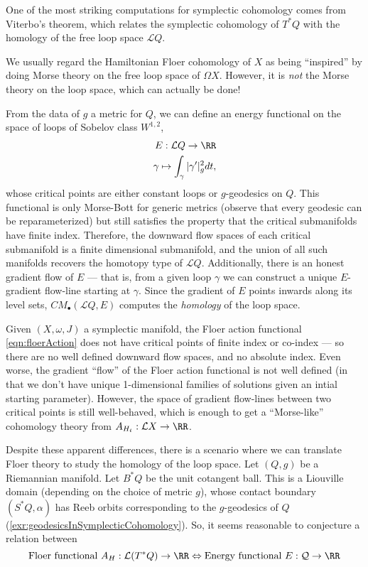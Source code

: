 
    One of the most striking computations for symplectic cohomology comes from Viterbo's theorem, which relates the symplectic cohomology of $T^*Q$ with the homology of the free loop space $\mathcal L Q$.
    
    We usually regard the Hamiltonian Floer cohomology of $X$ as being ``inspired'' by doing Morse theory on the free loop space of $\Omega X$. However, it is \emph{not} the Morse theory on the loop space, which can actually be done!

    From the data of $g$ a metric for $Q$, we can define an energy functional on the space of loops of Sobelov class $W^{1,2}$,
    \begin{align*}
        E: \mathcal LQ\to \RR\\
        \gamma\mapsto \int_{\gamma}|\gamma'|^2_gdt,
    \end{align*}
    whose critical points are either constant loops or $g$-geodesics on $Q$. 
    This functional is only Morse-Bott for generic metrics (observe that every geodesic can be reparameterized) but still satisfies the property that the critical submanifolds have finite index. Therefore, the downward flow spaces of each critical submanifold is a finite dimensional submanifold, and the union of all such manifolds recovers the homotopy type of $\mathcal LQ$. Additionally, there is an honest gradient flow of $E$ --- that is, from a given loop $\gamma$ we can construct a unique $E$-gradient flow-line starting at $\gamma$. Since the gradient of $E$ points inwards along its level sets,  $CM_\bullet(\mathcal LQ, E)$ computes the \emph{homology} of the loop space.

    Given $(X, \omega, J)$ a symplectic manifold, the Floer action functional \cref{eqn:floerAction} does not have critical points of finite index or co-index --- so there are no well defined downward flow spaces, and no absolute index. Even worse, the gradient ``flow'' of the Floer action functional is not well defined (in that we don't have unique 1-dimensional families of solutions given an intial starting parameter). However, the space of gradient flow-lines between two critical points is still well-behaved, which is enough to get a ``Morse-like'' cohomology theory from $A_{H_t}:\mathcal L X \to \RR$.

    Despite these apparent differences, there is a scenario where we can translate Floer theory to study the homology of the loop space. Let $(Q, g)$ be a Riemannian manifold. Let $B^*Q$ be the unit cotangent ball. This is a Liouville domain (depending on the choice of metric $g$), whose contact boundary $(S^*Q, \alpha)$ has Reeb orbits corresponding to the $g$-geodesics of $Q$ (\cref{exr:geodesicsInSymplecticCohomology}). So, it seems reasonable to  conjecture a relation between 
    \[\text{Floer functional $A_{H}:\mathcal L(T^*Q)\to \RR$}\Leftrightarrow\text{Energy functional $E:\mathcal Q\to \RR$}\]

